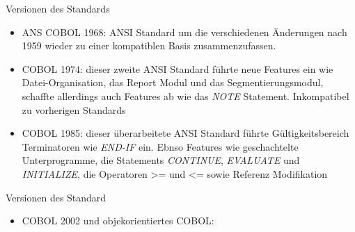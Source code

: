 \documentclass{beamer}
\begin{document}
\begin{frame}{Versionen des Standards}
  \begin{itemize}
  \item
    ANS COBOL 1968: ANSI Standard um die verschiedenen Änderungen nach 1959 wieder zu einer kompatiblen Basis zusammenzufassen.
  \item
    COBOL 1974: dieser zweite ANSI Standard führte neue Features ein wie Datei-Organisation, das Report Modul und das Segmentierungsmodul, schaffte allerdings auch Features ab wie das \emph{NOTE} Statement. Inkompatibel zu vorherigen Standards
  \item
    COBOL 1985: dieser überarbeitete ANSI Standard führte Gültigkeitsbereich Terminatoren wie \emph{END-IF} ein. Ebnso Features wie geschachtelte Unterprogramme, die Statements \emph{CONTINUE}, \emph{EVALUATE} und \emph{INITIALIZE}, die Operatoren >= und <= sowie Referenz Modifikation
  \end{itemize}
\end{frame}

\begin{frame}{Versionen des Standard}
  \begin{itemize}
    \item
      COBOL 2002 und objekorientiertes COBOL: 
  \end{itemize}
\end{frame}
\end{document}
